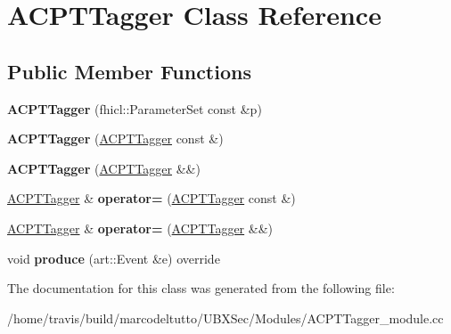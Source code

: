 \hypertarget{classACPTTagger}{\section{\-A\-C\-P\-T\-Tagger \-Class \-Reference}
\label{classACPTTagger}
}
\subsection*{\-Public \-Member \-Functions}
\begin{DoxyCompactItemize}
\item 
\hypertarget{classACPTTagger_a40826f58d28a7a25c0eeab2db30fa348}{{\bfseries \-A\-C\-P\-T\-Tagger} (fhicl\-::\-Parameter\-Set const \&p)}\label{classACPTTagger_a40826f58d28a7a25c0eeab2db30fa348}

\item 
\hypertarget{classACPTTagger_a3ca931a40fd898b581ee821229cee38b}{{\bfseries \-A\-C\-P\-T\-Tagger} (\hyperlink{classACPTTagger}{\-A\-C\-P\-T\-Tagger} const \&)}\label{classACPTTagger_a3ca931a40fd898b581ee821229cee38b}

\item 
\hypertarget{classACPTTagger_a9896d9b03b3f23c0a5d90a269e8c14e6}{{\bfseries \-A\-C\-P\-T\-Tagger} (\hyperlink{classACPTTagger}{\-A\-C\-P\-T\-Tagger} \&\&)}\label{classACPTTagger_a9896d9b03b3f23c0a5d90a269e8c14e6}

\item 
\hypertarget{classACPTTagger_a6a4ab1c8dac42b6b97310552c6356aff}{\hyperlink{classACPTTagger}{\-A\-C\-P\-T\-Tagger} \& {\bfseries operator=} (\hyperlink{classACPTTagger}{\-A\-C\-P\-T\-Tagger} const \&)}\label{classACPTTagger_a6a4ab1c8dac42b6b97310552c6356aff}

\item 
\hypertarget{classACPTTagger_a6deb1e43ce7cbf8d7fcc13bd77980caf}{\hyperlink{classACPTTagger}{\-A\-C\-P\-T\-Tagger} \& {\bfseries operator=} (\hyperlink{classACPTTagger}{\-A\-C\-P\-T\-Tagger} \&\&)}\label{classACPTTagger_a6deb1e43ce7cbf8d7fcc13bd77980caf}

\item 
\hypertarget{classACPTTagger_a263217e3f0e822270756d498623788fb}{void {\bfseries produce} (art\-::\-Event \&e) override}\label{classACPTTagger_a263217e3f0e822270756d498623788fb}

\end{DoxyCompactItemize}


\-The documentation for this class was generated from the following file\-:\begin{DoxyCompactItemize}
\item 
/home/travis/build/marcodeltutto/\-U\-B\-X\-Sec/\-Modules/\-A\-C\-P\-T\-Tagger\-\_\-module.\-cc\end{DoxyCompactItemize}
